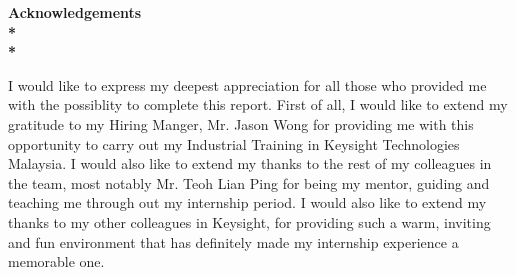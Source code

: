 \begin{center}

\bf{{\LARGE Acknowledgements}}\\*~\\*





\end{center}

I would like to express my deepest appreciation for all those who provided me with the possiblity
to complete this report. First of all, I would like to extend my gratitude to my Hiring Manger, Mr. Jason Wong for providing me with 
this opportunity to carry out my Industrial Training in Keysight Technologies Malaysia. I would also like to 
extend my thanks to the rest of my colleagues in the team, most notably Mr. Teoh Lian Ping for being my mentor, guiding and teaching me 
through out my internship period. I would also like to extend my thanks to my other colleagues in Keysight, for providing such a warm,
inviting and fun environment that has definitely made my internship experience a memorable one.                                             